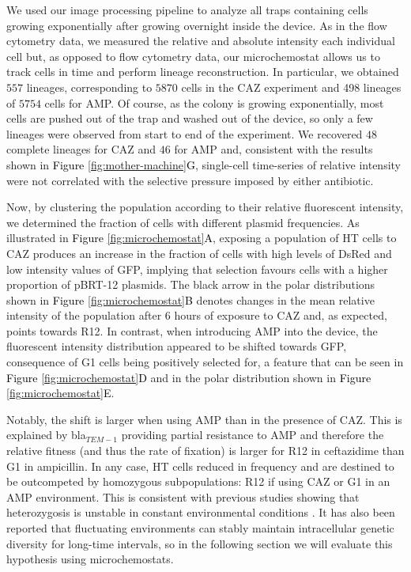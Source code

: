 \documentclass[fleqn,12pt]{wlscirep}
\newcommand{\fig}[1]{\textcolor{black}{#1}}
\begin{document}
We used our image processing pipeline to analyze all traps containing cells growing exponentially after growing overnight inside the device.  As in the flow cytometry data, we measured the relative and absolute intensity each individual cell but, as opposed to flow cytometry data, our microchemostat allows us to track cells in time and perform lineage reconstruction.  In particular, we obtained $557$ lineages, corresponding to $5870$ cells in the CAZ experiment and 498 lineages of $5754$ cells for AMP.  
Of course, as the colony is growing exponentially, most cells are pushed out of the trap and washed out of the device, so only a few lineages were observed from start to end of the experiment. We recovered $48$ complete lineages for CAZ and $46$ for AMP and, consistent with the results shown in \fig{Figure \ref{fig:mother-machine}G}, single-cell time-series of relative intensity were not correlated with the selective pressure imposed by either antibiotic.

Now, by clustering the population according to their relative fluorescent intensity, we determined the fraction of cells with different plasmid frequencies.
As illustrated in \fig{Figure \ref{fig:microchemostat}A}, exposing a population of HT cells to CAZ produces an increase in the fraction of cells with high levels of DsRed and low intensity values of GFP, implying that selection favours cells with a higher proportion of pBRT-12 plasmids.
The black arrow in the polar distributions shown in \fig{Figure \ref{fig:microchemostat}B} denotes changes in the mean relative intensity of the population after 6 hours of exposure to CAZ and, as expected, points towards R12. 
In contrast, when introducing AMP into the device, the fluorescent intensity distribution appeared to be shifted towards GFP, consequence of G1 cells being positively selected for, a feature that can be seen in \fig{Figure \ref{fig:microchemostat}D} and in the polar distribution shown in \fig{Figure \ref{fig:microchemostat}E}.

Notably, the shift is larger when using AMP than in the presence of CAZ. This is explained by bla$_{TEM-1}$ providing partial resistance to AMP and therefore the relative fitness (and thus the rate of fixation) is larger for R12 in ceftazidime than G1 in ampicillin.
In any case, HT cells reduced in frequency and are destined to be outcompeted by homozygous subpopulations: R12 if using CAZ or G1 in an AMP environment.  This is consistent with previous studies showing that heterozygosis is unstable in constant environmental conditions \cite{Rodriguez2018}. It has also been reported that fluctuating environments can stably maintain intracellular genetic diversity for long-time intervals, so in the following section we will evaluate this hypothesis using microchemostats.
\end{document}
